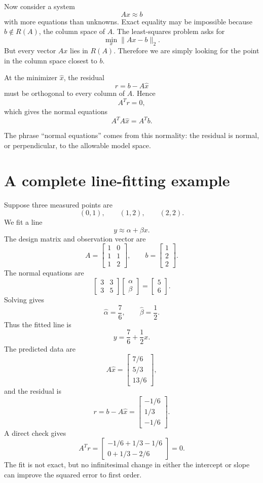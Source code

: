 Now consider a system
\[
  Ax\approx b
\]
with more equations than unknowns.  Exact equality may be impossible because \(b\notin R(A)\), the column space of \(A\).  The least-squares problem asks for
\[
  \min_x\|Ax-b\|_2.
\]
But every vector \(Ax\) lies in \(R(A)\).  Therefore we are simply looking for the point in the column space closest to \(b\).

At the minimizer \(\widehat x\), the residual
\[
  r=b-A\widehat x
\]
must be orthogonal to every column of \(A\).  Hence
\[
  A^Tr=0,
\]
which gives the normal equations
\[
  \boxed{A^TA\widehat x=A^Tb.}
\]

The phrase ``normal equations'' comes from this normality: the residual is normal, or perpendicular, to the allowable model space.

\section{A complete line-fitting example}

Suppose three measured points are
\[
  (0,1),\qquad (1,2),\qquad (2,2).
\]
We fit a line
\[
  y\approx\alpha+\beta x.
\]
The design matrix and observation vector are
\[
  A=
  \begin{bmatrix}
    1&0\\
    1&1\\
    1&2
  \end{bmatrix},
  \qquad
  b=
  \begin{bmatrix}
    1\\2\\2
  \end{bmatrix}.
\]
The normal equations are
\[
  \begin{bmatrix}
    3&3\\
    3&5
  \end{bmatrix}
  \begin{bmatrix}
    \alpha\\\beta
  \end{bmatrix}
  =
  \begin{bmatrix}
    5\\6
  \end{bmatrix}.
\]
Solving gives
\[
  \widehat\alpha=\frac76,
  \qquad
  \widehat\beta=\frac12.
\]
Thus the fitted line is
\[
  y=\frac76+\frac12x.
\]
The predicted data are
\[
  A\widehat x=
  \begin{bmatrix}
    7/6\\5/3\\13/6
  \end{bmatrix},
\]
and the residual is
\[
  r=b-A\widehat x
  =
  \begin{bmatrix}
    -1/6\\1/3\\-1/6
  \end{bmatrix}.
\]
A direct check gives
\[
  A^Tr=
  \begin{bmatrix}
    -1/6+1/3-1/6\\
    0+1/3-2/6
  \end{bmatrix}
  =0.
\]
The fit is not exact, but no infinitesimal change in either the intercept or slope can improve the squared error to first order.

